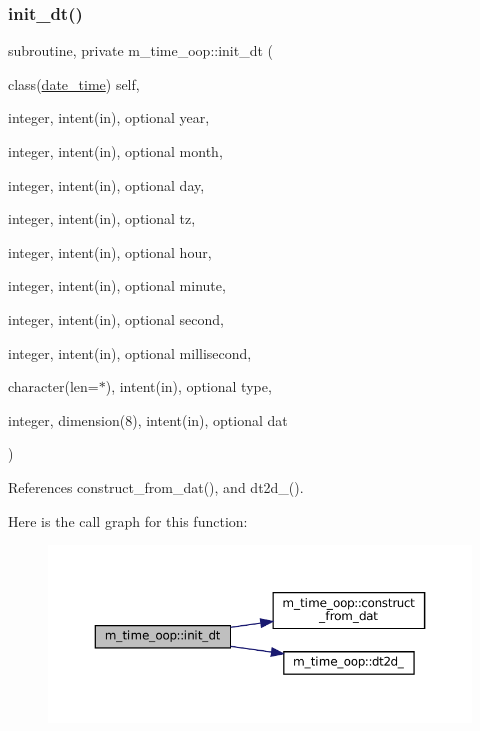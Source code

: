 \subsubsection{\texorpdfstring{init\+\_\+dt()}{init\_dt()}}
{\footnotesize\ttfamily subroutine, private m\+\_\+time\+\_\+oop\+::init\+\_\+dt (\begin{DoxyParamCaption}\item[{class(\mbox{\hyperlink{structm__time__oop_1_1date__time}{date\+\_\+time}})}]{self,  }\item[{integer, intent(in), optional}]{year,  }\item[{integer, intent(in), optional}]{month,  }\item[{integer, intent(in), optional}]{day,  }\item[{integer, intent(in), optional}]{tz,  }\item[{integer, intent(in), optional}]{hour,  }\item[{integer, intent(in), optional}]{minute,  }\item[{integer, intent(in), optional}]{second,  }\item[{integer, intent(in), optional}]{millisecond,  }\item[{character(len=$\ast$), intent(in), optional}]{type,  }\item[{integer, dimension(8), intent(in), optional}]{dat }\end{DoxyParamCaption})\hspace{0.3cm}{\ttfamily [private]}}



References construct\+\_\+from\+\_\+dat(), and dt2d\+\_\+().

Here is the call graph for this function\+:\nopagebreak
\begin{figure}[H]
\begin{center}
\leavevmode
\includegraphics[width=350pt]{namespacem__time__oop_ac81ff1eb27f637a60530d3c5d442fc71_cgraph}
\end{center}
\end{figure}
\mbox{\label{namespacem__time__oop_a85c4d4edaa644bf22f68ffd724de036a}} 

